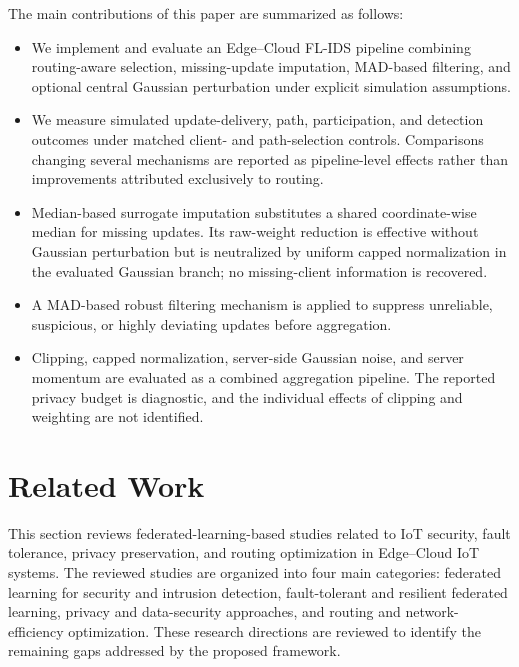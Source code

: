 \documentclass[5p,times,numafflabel]{elsarticle}
\begin{document}
	
	The main contributions of this paper are summarized as follows:
	
	\begin{itemize}
	\item We implement and evaluate an Edge--Cloud FL-IDS pipeline
	combining routing-aware selection, missing-update imputation,
	MAD-based filtering, and optional central Gaussian perturbation
	under explicit simulation assumptions.
	
	\item We measure simulated update-delivery, path, participation,
	and detection outcomes under matched client- and path-selection
	controls. Comparisons changing several mechanisms are reported
	as pipeline-level effects rather than improvements attributed
	exclusively to routing.
	\item Median-based surrogate imputation substitutes a shared
		coordinate-wise median for missing updates. Its raw-weight reduction
		is effective without Gaussian perturbation but is neutralized by
		uniform capped normalization in the evaluated Gaussian branch;
		no missing-client information is recovered.
		
		\item A MAD-based robust filtering mechanism is applied to suppress
		unreliable, suspicious, or highly deviating updates before
		aggregation.
		
				\item Clipping, capped normalization, server-side Gaussian noise,
		and server momentum are evaluated as a combined aggregation pipeline.
		The reported privacy budget is diagnostic, and the individual
		effects of clipping and weighting are not identified.
	\end{itemize}
	
	
	\section{Related Work}
	\label{sec:related}
	
	This section reviews federated-learning-based studies related to
	IoT security, fault tolerance, privacy preservation, and routing
	optimization in Edge--Cloud IoT systems. The reviewed studies are
	organized into four main categories: federated learning for security
	and intrusion detection, fault-tolerant and resilient federated
	learning, privacy and data-security approaches, and routing and
	network-efficiency optimization. These research directions are
	reviewed to identify the remaining gaps addressed by the proposed
	framework.
	
\end{document}
